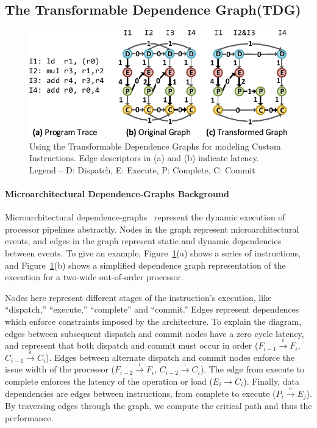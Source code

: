 \subsection{The Transformable Dependence Graph(TDG)}
\begin{figure}[tbp]
  \begin{center}
    \includegraphics[width=0.6\linewidth]{figs/example.pdf}
  \end{center}
\vspace{-0.2in}
  \caption{Using the Transformable Dependence Graphs for modeling Custom Instructions. \newline
{\small
Edge descriptors in (a) and (b) indicate latency.
Legend --  D: Dispatch, E: Execute, P: Complete, C: Commit
}}
  \label{fig:example}
\vspace{-0.05in}
\end{figure}

\paragraph{Microarchitectural Dependence-Graphs Background}
Microarchitectural dependence-graphs~\cite{fields:isca01}
represent the dynamic execution of processor pipelines abstractly.  
Nodes in the graph represent microarchitectural events,
and edges in the graph represent static and dynamic dependencies 
between events.  To give an example, 
Figure~\ref{fig:example}(a) shows a series of instructions, and 
Figure~\ref{fig:example}(b) shows a simplified dependence graph
representation of the execution for a two-wide out-of-order processor.

Nodes here represent different stages of the instruction's execution, 
like ``dispatch,'' ``execute,'' ``complete'' and ``commit.'' 
Edges represent dependences
which enforce constraints imposed by the architecture.  
To explain the diagram, edges 
between subsequent dispatch and commit nodes have a zero cycle latency,
and represent that both dispatch and commit must occur in order
($F_{i-1} \xrightarrow{_0} F_{i}$, $C_{i-1} \xrightarrow{_0} C_{i}$).  Edges between
alternate dispatch and commit nodes enforce the
issue width of the processor ($F_{i-2} \xrightarrow{_1} F_{i}$, $C_{i-2} \xrightarrow{_1} C_{i}$). 
The edge from execute to complete enforces
the latency of the operation or load ($E_{i} \rightarrow C_{i}$).  
Finally, data dependencies are edges between instructions, from 
 complete to execute ($P_{i} \xrightarrow{_0} E_{j}$).
By traversing edges through the graph, we compute the critical path and thus
the performance. 

